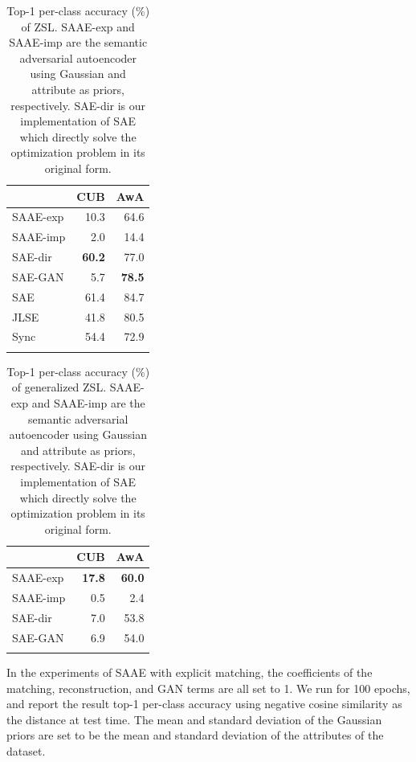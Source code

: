 \documentclass{article}
\begin{document}
\begin{table}[!htb]
\centering
\begin{tabular}{lrr}
\toprule
 & CUB & AwA \\
\midrule
SAAE-exp & 10.3 & 64.6 \\
SAAE-imp & 2.0 & 14.4 \\
SAE-dir & \bf{60.2} & 77.0 \\
SAE-GAN & 5.7 & \bf{78.5} \\
\midrule
SAE \cite{kodirov2017semantic} & 61.4 & 84.7 \\
JLSE \cite{zhang2016zero} & 41.8 & 80.5 \\
Sync \cite{changpinyo2016synthesized} & 54.4 & 72.9 \\
\bottomrule \\
\end{tabular}
\caption{Top-1 per-class accuracy (\%) of ZSL. SAAE-exp and SAAE-imp are the semantic adversarial autoencoder using Gaussian and attribute as priors, respectively. SAE-dir is our implementation of SAE which directly solve the optimization problem in its original form.}
\label{tab:StandardZSL}
\end{table}

\begin{table}[!htb]
\centering
\begin{tabular}{lrr}
\toprule
 & CUB & AwA \\
\midrule
SAAE-exp & \bf{17.8} & \bf{60.0} \\
SAAE-imp & 0.5 & 2.4 \\
SAE-dir & 7.0 & 53.8 \\
SAE-GAN & 6.9 & 54.0 \\
\bottomrule \\
\end{tabular}
\caption{Top-1 per-class accuracy (\%) of generalized ZSL. SAAE-exp and SAAE-imp are the semantic adversarial autoencoder using Gaussian and attribute as priors, respectively. SAE-dir is our implementation of SAE which directly solve the optimization problem in its original form.}
\label{tab:GeneralizedZSL}
\end{table}

In the experiments of SAAE with explicit matching, the coefficients of the matching, reconstruction, and GAN terms are all set to 1. We run for 100 epochs, and report the result top-1 per-class accuracy using negative cosine similarity as the distance at test time. The mean and standard deviation of the Gaussian priors are set to be the mean and standard deviation of the attributes of the dataset.
\end{document}
